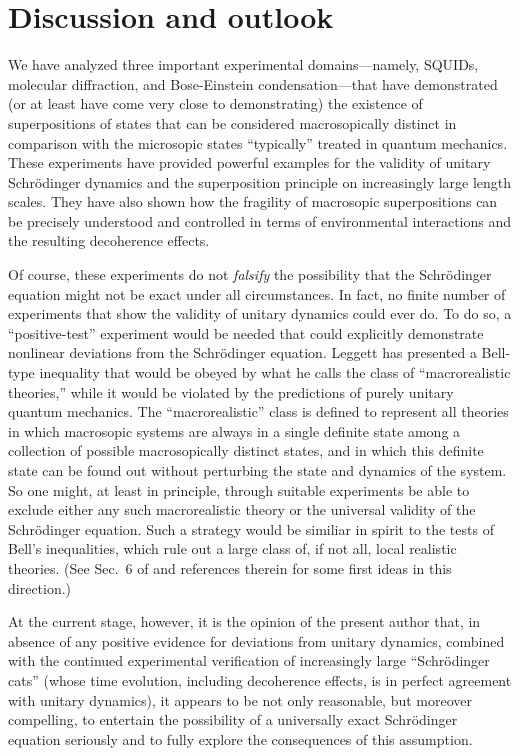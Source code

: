 \documentclass[12pt,aps,floatfix,amsmath,amssymb,showpacs,nofootinbib]{revtex4-2}
\begin{document}
\section{Discussion and outlook} \label{sec:discussion}

We have analyzed three important experimental domains---namely,
SQUIDs, molecular diffraction, and Bose-Einstein condensation---that
have demonstrated (or at least have come very close to demonstrating)
the existence of superpositions of states that can be considered
macrosopically distinct in comparison with the microsopic states
``typically'' treated in quantum mechanics. These experiments have
provided powerful examples for the validity of unitary Schr\"odinger
dynamics and the superposition principle on increasingly large length
scales. They have also shown how the fragility of macrosopic
superpositions can be precisely understood and controlled in terms of
environmental interactions and the resulting decoherence effects.

Of course, these experiments do not {\em falsify} the possibility that
the Schr\"odinger equation might not be exact under all circumstances.
In fact, no finite number of experiments that show the validity of
unitary dynamics could ever do. To do so, a ``positive-test''
experiment would be needed that could explicitly demonstrate nonlinear
deviations from the Schr\"odinger equation.  Leggett
\cite{Leggett:1980:yt,Leggett:2002:uy} has presented a Bell-type
inequality that would be obeyed by what he calls the class of
``macrorealistic theories,'' while it would be violated by the
predictions of purely unitary quantum mechanics. The
``macrorealistic'' class is defined to represent all theories in which
macrosopic systems are always in a single definite state among a
collection of possible macrosopically distinct states, and in which
this definite state can be found out without perturbing the state and
dynamics of the system.  So one might, at least in principle, through
suitable experiments be able to exclude either any such macrorealistic
theory or the universal validity of the Schr\"odinger equation. Such a
strategy would be similiar in spirit to the tests of Bell's
inequalities, which rule out a large class of, if not all, local
realistic theories.  (See Sec.~6 of \cite{Leggett:2002:uy} and
references therein for some first ideas in this direction.)

At the current stage, however, it is the opinion of the present author
that, in  absence of any positive evidence for deviations from
unitary dynamics, combined with the continued experimental
verification of increasingly large ``Schr\"odinger cats'' (whose time
evolution, including decoherence effects, is in perfect agreement with
unitary dynamics), it appears to be not only reasonable, but moreover
compelling, to entertain the possibility of a universally exact
Schr\"odinger equation seriously and to fully explore the consequences
of this assumption.
\end{document}
